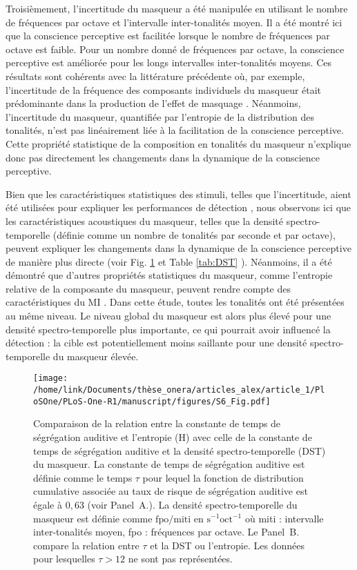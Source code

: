 Troisièmement, l'incertitude du masqueur a été manipulée en utilisant le nombre de fréquences par octave et l'intervalle inter-tonalités moyen. 
Il a été montré ici que la conscience perceptive est facilitée lorsque le nombre de fréquences par octave est faible. 
Pour un nombre donné de fréquences par octave, la conscience perceptive est améliorée pour les longs intervalles inter-tonalités moyens. 
Ces résultats sont cohérents avec la littérature précédente où, par exemple, l'incertitude de la fréquence des composants individuels du masqueur était prédominante dans la production de l'effet de masquage \citep{neff1988effective, neff1995individual}. 
Néanmoins, l'incertitude du masqueur, quantifiée par l'entropie de la distribution des tonalités, n'est pas linéairement liée à la facilitation de la conscience perceptive. 
Cette propriété statistique de la composition en tonalités du masqueur n'explique donc pas directement les changements dans la dynamique de la conscience perceptive. 

Bien que les caractéristiques statistiques des stimuli, telles que l'incertitude, aient été utilisées pour expliquer les performances de détection \citep{chang2016detection, lutfi2013information}, nous observons ici que les caractéristiques acoustiques du masqueur, telles que la densité spectro-temporelle (définie comme un nombre de tonalités par seconde et par octave), peuvent expliquer les changements dans la dynamique de la conscience perceptive de manière plus directe (voir Fig. \ref{fig:HvsSTD} et Table \ref{tab:DST} ). 
Néanmoins, il a été démontré que d'autres propriétés statistiques du masqueur, comme l'entropie relative de la composante du masqueur, peuvent rendre compte des caractéristiques du MI \citep{lutfi1993model, oh1998nonmonotonicity}. 
Dans cette étude, toutes les tonalités ont été présentées au même niveau. 
Le niveau global du masqueur est alors plus élevé pour une densité spectro-temporelle plus importante, ce qui pourrait avoir influencé la détection : la cible est potentiellement moins saillante pour une densité spectro-temporelle du masqueur élevée.

\begin{figure}[!t]
\texttt{[image: /home/link/Documents/thèse\_onera/articles\_alex/article\_1/PloSOne/PLoS-One-R1/manuscript/figures/S6\_Fig.pdf]}
\caption[Comparaison entre constantes de temps et entropie et densité spectro-temporelle]{
Comparaison de la relation entre la constante de temps de ségrégation auditive et l'entropie (H) avec celle de la constante de temps de ségrégation auditive et la densité spectro-temporelle (DST) du masqueur. 
La constante de temps de ségrégation auditive est définie comme le temps $\tau$ pour lequel la fonction de distribution cumulative associée au taux de risque de ségrégation auditive est égale à $0,63$ (voir Panel~A.). 
La densité spectro-temporelle du masqueur est définie comme $\mathrm{fpo}/\mathrm{miti}$ en $\mathrm{s}^{-1}\mathrm{oct}^{-1}$ où miti : intervalle inter-tonalités moyen, fpo : fréquences par octave. 
Le Panel~B. compare la relation entre $\tau$ et la DST ou l'entropie. 
Les données pour lesquelles $\tau>12$ ne sont pas représentées.}
\label{fig:HvsSTD}
\end{figure}

